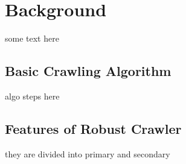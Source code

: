 \chapter{Background}
some text here

\section{Basic Crawling Algorithm}
algo steps here

\section{Features of Robust Crawler}
they are divided into primary and secondary

\pagebreak
